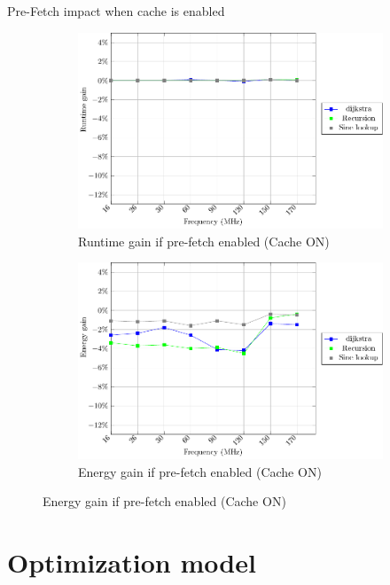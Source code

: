 \documentclass[
	11pt, %
]{beamer}
\begin{document}
\begin{frame}{Pre-Fetch impact when cache is enabled}
	\begin{figure}
		\begin{subfigure}{0.4\textwidth}
			\includegraphics[scale = 0.4]{data/stm32g_v2/pre_fetch_impact_cache_on/duration.pdf}
			\caption{Runtime gain if pre-fetch enabled (Cache ON)}
		\end{subfigure}
		\begin{subfigure}{0.4\textwidth}
			\includegraphics[scale = 0.4]{data/stm32g_v2/pre_fetch_impact_cache_on/energy.pdf}
			\caption{Energy gain if pre-fetch enabled (Cache ON)}
		\end{subfigure}

	\end{figure}
\end{frame}

\section{Optimization model}
\end{document}
